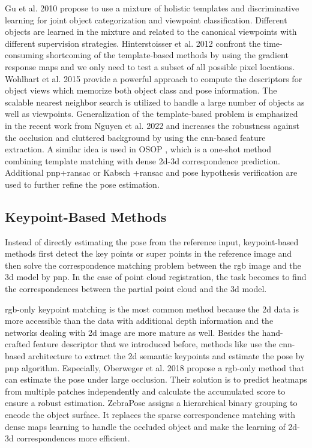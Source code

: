 \documentclass[12pt,DIV14,BCOR12mm,a4paper,footinclude=false,headinclude,parskip=half-,twoside,openright,cleardoublepage=empty,toc=index,bibliography=totoc,listof=totoc]{scrreprt}
\numberwithin{equation}{chapter}
\begin{document}
Gu et al. 2010 \cite{gu2010discriminative} propose to use a mixture of holistic templates and discriminative learning for joint object categorization and viewpoint classification. Different objects are learned in the mixture and related to the canonical viewpoints with different supervision strategies. Hinterstoisser et al. 2012 \cite{hinterstoisser2012gradient} confront the time-consuming shortcoming of the template-based methods by using the gradient response maps and we only need to test a subset of all possible pixel locations. Wohlhart et al. 2015 \cite{Wohlhart_2015} provide a powerful approach to compute the descriptors for object views which memorize both object class and pose information. The scalable nearest neighbor search is utilized to handle a large number of objects as well as viewpoints. Generalization of the template-based problem is emphasized in the recent work from Nguyen et al. 2022 \cite{nguyen2022templates} and increases the robustness against the occlusion and cluttered background by using the \gls{cnn}-based feature extraction. A similar idea is used in OSOP \cite{shugurov2022osop}, which is a one-shot method combining template matching with dense \gls{2d}-\gls{3d} correspondence prediction. Additional \gls{pnp}+\gls{ransac} or Kabsch \cite{kabsch1976solution}+\gls{ransac} and pose hypothesis verification are used to further refine the pose estimation.
\subsection{Keypoint-Based Methods} 
Instead of directly estimating the pose from the reference input, keypoint-based methods first detect the key points or super points in the reference image and then solve the correspondence matching problem between the \gls{rgb} image and the \gls{3d} model by \gls{pnp}. In the case of point cloud registration, the task becomes to find the correspondences between the partial point cloud and the \gls{3d} model.

\gls{rgb}-only keypoint matching is the most common method because the \gls{2d} data is more accessible than the data with additional depth information and the networks dealing with \gls{2d} image are more mature as well. Besides the hand-crafted feature descriptor that we introduced before, methods like \cite{pavlakos20176dof, rad2018bb8, pmlr-v87-tremblay18a,tekin2018realtime, zakharov2019dpod} use the \gls{cnn}-based architecture to extract the \gls{2d} semantic keypoints and estimate the pose by \gls{pnp} algorithm. Especially, Oberweger et al. 2018 \cite{oberweger2018making} propose a \gls{rgb}-only method that can estimate the pose under large occlusion. Their solution is to predict heatmaps from multiple patches independently and calculate the accumulated score to ensure a robust estimation. ZebraPose \cite{su2022zebrapose} assigns a hierarchical binary grouping to encode the object surface. It replaces the sparse correspondence matching with dense maps learning to handle the occluded object and make the learning of \gls{2d}-\gls{3d} correspondences more efficient.
\end{document}
